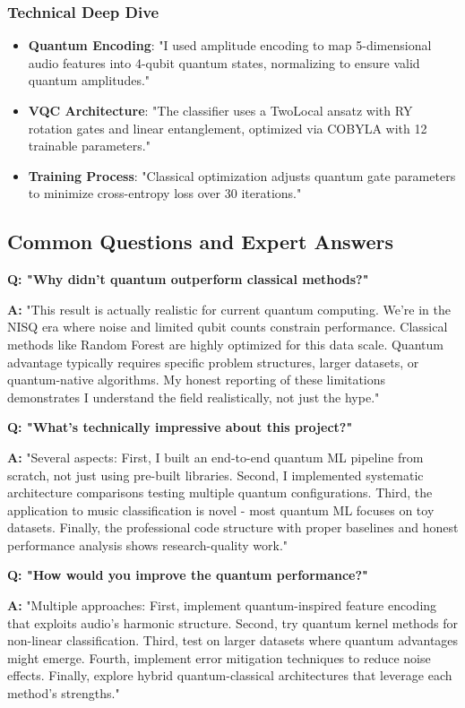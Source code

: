 \documentclass[11pt,a4paper]{article}
\begin{document}
\subsubsection{Technical Deep Dive}
\begin{itemize}
    \item \textbf{Quantum Encoding}: "I used amplitude encoding to map 5-dimensional audio features into 4-qubit quantum states, normalizing to ensure valid quantum amplitudes."
    \item \textbf{VQC Architecture}: "The classifier uses a TwoLocal ansatz with RY rotation gates and linear entanglement, optimized via COBYLA with 12 trainable parameters."
    \item \textbf{Training Process}: "Classical optimization adjusts quantum gate parameters to minimize cross-entropy loss over 30 iterations."
\end{itemize}

\subsection{Common Questions and Expert Answers}

\textbf{Q: "Why didn't quantum outperform classical methods?"}

\textbf{A:} "This result is actually realistic for current quantum computing. We're in the NISQ era where noise and limited qubit counts constrain performance. Classical methods like Random Forest are highly optimized for this data scale. Quantum advantage typically requires specific problem structures, larger datasets, or quantum-native algorithms. My honest reporting of these limitations demonstrates I understand the field realistically, not just the hype."

\textbf{Q: "What's technically impressive about this project?"}

\textbf{A:} "Several aspects: First, I built an end-to-end quantum ML pipeline from scratch, not just using pre-built libraries. Second, I implemented systematic architecture comparisons testing multiple quantum configurations. Third, the application to music classification is novel - most quantum ML focuses on toy datasets. Finally, the professional code structure with proper baselines and honest performance analysis shows research-quality work."

\textbf{Q: "How would you improve the quantum performance?"}

\textbf{A:} "Multiple approaches: First, implement quantum-inspired feature encoding that exploits audio's harmonic structure. Second, try quantum kernel methods for non-linear classification. Third, test on larger datasets where quantum advantages might emerge. Fourth, implement error mitigation techniques to reduce noise effects. Finally, explore hybrid quantum-classical architectures that leverage each method's strengths."
\end{document}
